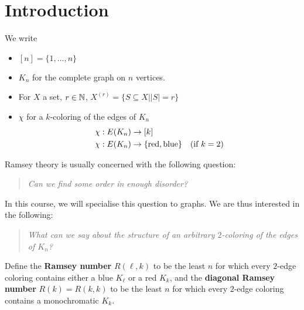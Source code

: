 \documentclass{article}
\begin{document}
\maketitle

\tableofcontents

\clearpage
\section{Introduction}

\newlec

\begin{notation}
  We write
  \begin{itemize}
    \item $[n] = \{1, \dots, n\}$
    \item $K_n$ for the complete graph on $n$ vertices.
    \item For $X$ a set, $r \in \mathbb N$, $X^{(r)} = \{S \subseteq X | |S| = r\}$
    \item $\chi$ for a $k$-coloring of the edges of $K_n$
      \begin{align*}
        & \chi : E(K_n) \rightarrow [k] & \\
        & \chi : E(K_n) \rightarrow \{\text{red}, \text{blue}\} & (\text{if } k = 2)
      \end{align*}
  \end{itemize}
\end{notation}

Ramsey theory is usually concerned with the following question:

\begin{quotation}
  \textit{Can we find some order in enough disorder?}
\end{quotation}

In this course, we will specialise this question to graphs. We are thus interested in the following:

\begin{quotation}
  \textit{What can we say about the structure of an arbitrary $2$-coloring of the edges of $K_n$?}
\end{quotation}

\begin{defi}
  Define the {\bf Ramsey number} $R(\ell, k)$ to be the least $n$ for which every $2$-edge coloring contains either a blue $K_\ell$ or a red $K_k$, and the {\bf diagonal Ramsey number} $R(k) = R(k, k)$ to be the least $n$ for which every $2$-edge coloring contains a monochromatic $K_k$.
\end{defi}
\end{document}
